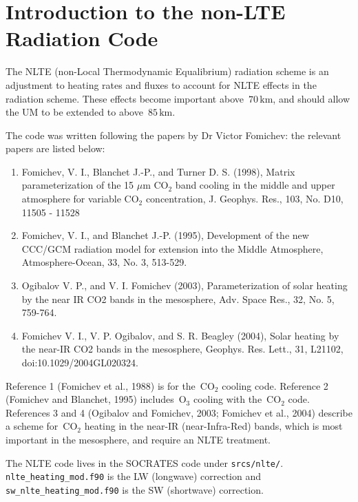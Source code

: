 \section{Introduction to the non-LTE Radiation Code}

The NLTE (non-Local Thermodynamic Equalibrium) radiation scheme is an adjustment to heating rates and fluxes to account for NLTE effects in the radiation scheme. These effects become important above~$70\, \text{km}$, and should allow the UM to be extended to above~$85\, \text{km}$.

The code was written following the papers by Dr Victor Fomichev: the relevant papers are listed below:

\begin{enumerate}
\item Fomichev, V. I., Blanchet J.-P., and Turner D. S. (1998), Matrix
parameterization of the 15 $\mu$m CO$_2$ band cooling in the middle
and upper atmosphere for variable CO$_2$ concentration,
J. Geophys. Res., 103, No. D10, 11505 - 11528
 
\item Fomichev, V. I., and Blanchet J.-P. (1995), Development of the new
CCC/GCM radiation model for extension into the Middle Atmosphere,
Atmosphere-Ocean, 33, No. 3, 513-529.
 
\item Ogibalov V. P., and V. I. Fomichev (2003), Parameterization of
solar heating by the near IR CO2 bands in the mesosphere, Adv. Space
Res., 32, No. 5, 759-764.
 
\item Fomichev V. I., V. P. Ogibalov, and S. R. Beagley (2004), Solar
heating by the near-IR CO2 bands in the mesosphere,
Geophys. Res. Lett., 31, L21102, \\
\noindent doi:10.1029/2004GL020324.
\end{enumerate}

Reference 1 (Fomichev et al., 1988) is for the~CO$_2$ cooling code. Reference 2 (Fomichev and Blanchet, 1995) includes~O$_3$ cooling with the~CO$_2$ code. References 3 and 4 (Ogibalov and Fomichev, 2003; Fomichev et al., 2004) describe a scheme for~CO$_2$ heating in the near-IR (near-Infra-Red) bands, which is most important in the mesosphere, and require an NLTE treatment.

The NLTE code lives in the SOCRATES code under {\tt srcs/nlte/}. {\tt nlte\_heating\_mod.f90} is the LW (longwave) correction  and {\tt sw\_nlte\_heating\_mod.f90} is the SW (shortwave) correction.

